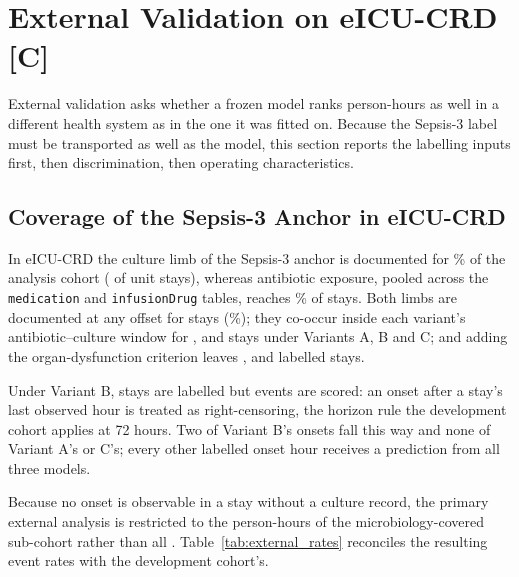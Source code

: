 

\section{External Validation on eICU-CRD \texorpdfstring{[C]}{[C]}}
\label{sec:external_validation}
\label{sec:external}

External validation asks whether a frozen model ranks person-hours as well in a
different health system as in the one it was fitted on. Because the Sepsis-3
label must be transported as well as the model, this section reports the
labelling inputs first, then discrimination, then operating characteristics.

\subsection{Coverage of the Sepsis-3 Anchor in eICU-CRD}
\label{sec:external_coverage}

In eICU-CRD the culture limb of the Sepsis-3 anchor is documented for
\pcExtMicroCoverage\% of the analysis cohort (\pcExtNMicroStays{} of
\pcExtNCohortStays{} unit stays), whereas antibiotic exposure, pooled across
the \texttt{medication} and \texttt{infusionDrug} tables, reaches
\pcExtAbxCoverage\% of stays. Both limbs are documented at any offset for
\pcExtNBothLimbStays{} stays (\pcExtBothLimbCoverage\%); they co-occur inside
each variant's antibiotic--culture window for \pcExtNSuspicionA{},
\pcExtNSuspicionB{} and \pcExtNSuspicionC{} stays under Variants A, B and C;
and adding the organ-dysfunction criterion leaves \pcExtNOnsetStaysA{},
\pcExtNOnsetStaysB{} and \pcExtNOnsetStaysC{} labelled stays.

Under Variant B, \pcExtNOnsetStaysB{} stays are labelled but \pcExtNEventsB{}
events are scored: an onset after a stay's last observed hour is treated as
right-censoring, the horizon rule the development cohort applies at 72 hours.
Two of Variant B's onsets fall this way and none of Variant A's or C's; every
other labelled onset hour receives a prediction from all three models.

Because no onset is observable in a stay without a culture record, the primary
external analysis is restricted to the \pcExtPanelHoursMicro{} person-hours of
the microbiology-covered sub-cohort rather than all \pcExtPanelHoursFull{}.
Table~\ref{tab:external_rates} reconciles the resulting event rates with the
development cohort's.

